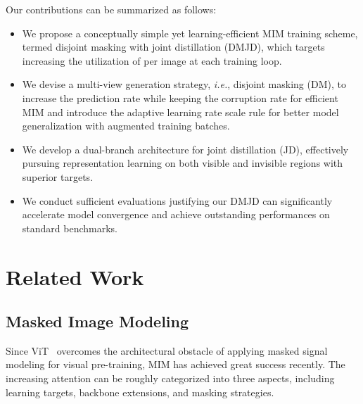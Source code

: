 \documentclass[lettersize,journal]{IEEEtran}
\begin{document}
Our contributions can be summarized as follows: 
\begin{itemize}[itemsep=2pt,topsep=0pt,parsep=0pt]
\item  We propose a conceptually simple yet learning-efficient MIM training scheme, termed disjoint masking with joint distillation (DMJD), which targets increasing the utilization of per image at each training loop.

\item We devise a multi-view generation strategy, \textit{i.e.}, disjoint masking (DM), to increase the prediction rate while keeping the corruption rate for efficient MIM and introduce the adaptive learning rate scale rule for better model generalization with augmented training batches.

\item We develop a dual-branch architecture for joint distillation (JD), effectively pursuing representation learning on both visible and invisible regions with superior targets.

\item We conduct sufficient evaluations justifying our DMJD can significantly accelerate model convergence and achieve outstanding performances on standard benchmarks.
\end{itemize}

\section{Related Work}
\subsection{Masked Image Modeling}
Since ViT~\cite{2021arXiv210313915S} overcomes the architectural obstacle of applying masked signal modeling for visual pre-training, MIM has achieved great success recently. 
The increasing attention can be roughly categorized into three aspects, including learning targets, backbone extensions, and masking strategies.  
\end{document}
